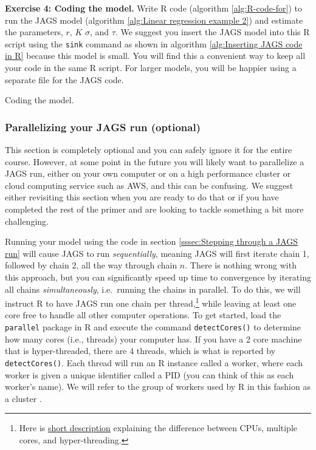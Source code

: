 \documentclass[12pt,english]{article}
\begin{document}
\belowcaptionskip=-20pt
\begin{exercise}
\begin{mdframed}
\doublespacing
\textbf{Exercise 4: Coding the model.} Write R code (algorithm \ref{alg:R-code-for}) to run the JAGS model (algorithm \ref{alg:Linear regression example 2}) and estimate the parameters, $r$, $K$ $\sigma$, and $\tau$. We suggest you insert the JAGS model into this R script using the \texttt{sink} command as shown in algorithm \ref{alg:Inserting JAGS code in R} because this model is small. You will find this a convenient way to keep all your code in the same R script. For larger models, you will be happier using a separate file for the JAGS code.
\end{mdframed}
\captionsetup{textformat=empty, labelformat=empty}
\caption[Coding the model]{Coding the model.}
\label{ex:logistic regression sequential}
\end{exercise}
\belowcaptionskip=0pt

\newpage

\subsubsection{Parallelizing your JAGS run (optional)}

This section is completely optional and you can safely ignore it for the entire course. However, at some point in the future you will likely want to parallelize a JAGS run, either on your own computer or on a high performance cluster or cloud computing service such as AWS, and this can be confusing. We suggest either revisiting this section when you are ready to do that or if you have completed the rest of the primer and are looking to tackle something a bit more challenging.

Running your model using the code in section \ref{sssec:Stepping through a JAGS run} will cause JAGS to run \emph{sequentially}, meaning JAGS will first iterate chain 1, followed by chain 2, all the way through chain $n$. There is nothing wrong with this approach, but you can significantly speed up time to convergence by iterating all chains \emph{simultaneously}, i.e.\ running the chains in parallel. To do this, we will instruct R to have JAGS run one chain per thread,\footnote{Here is \href{http://www.howtogeek.com/194756/cpu-basics-multiple-cpus-cores-and-hyper-threading-explained/}{short description} explaining the difference between CPUs, multiple cores, and hyper-threading.} while leaving at least one core free to handle all other computer operations. To get started, load the \texttt{parallel} package in R and execute the command \texttt{detectCores()} to determine how many cores (i.e., threads) your computer has. If you have a 2 core machine that is hyper-threaded, there are 4 threads, which is what is reported by \texttt{detectCores()}. Each thread will run an R instance called a worker, where each worker is given a unique identifier called a PID (you can think of this as each worker's name). We will refer to the group of workers used by R in this fashion as a cluster . 
\end{document}
